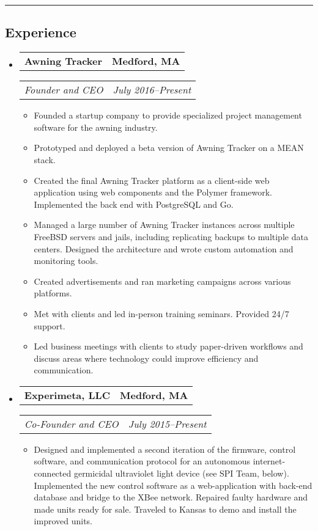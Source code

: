 \documentclass[10pt,letterpaper]{article}
\newcommand{\headerrow}[2]{%
    \begin{tabularx}{\linewidth}{Xr}
	    #1 & #2 \\
    \end{tabularx}
}
\begin{document}
\hrule
\vspace{-0.4em}
\subsection*{Experience}
\begin{itemize}
	\parskip=0.1em

	\item
	\headerrow{\textbf{Awning Tracker}}{\textbf{Medford, MA}}
	\headerrow{\emph{Founder and CEO}}{\emph{July 2016--Present}}
	\begin{itemize}
        \item Founded a startup company to provide specialized project
            management software for the awning industry.

        \item Prototyped and deployed a beta version of Awning Tracker on a
            MEAN stack.

        \item Created the final Awning Tracker platform as a client-side web
            application using web components and the Polymer framework.
            Implemented the back end with PostgreSQL and Go.

        \item Managed a large number of Awning Tracker instances across
            multiple FreeBSD servers and jails, including replicating backups
            to multiple data centers.  Designed the architecture and wrote
            custom automation and monitoring tools.

        \item Created advertisements and ran marketing campaigns across various
            platforms.

        \item Met with clients and led in-person training seminars.  Provided
            24/7 support.

        \item Led business meetings with clients to study paper-driven
            workflows and discuss areas where technology could improve
            efficiency and communication.
	\end{itemize}

    \item
    \headerrow{\textbf{Experimeta, LLC}}{\textbf{Medford, MA}}
    \headerrow{\emph{Co-Founder and CEO}}{\emph{July 2015--Present}}
    \begin{itemize}
        \item Designed and implemented a second iteration of the firmware,
            control software, and communication protocol for an autonomous
            internet-connected germicidal ultraviolet light device (see SPI
            Team, below).  Implemented the new control software as a
            web-application with back-end database and bridge to the XBee
            network.  Repaired faulty hardware and made units ready for sale.
            Traveled to Kansas to demo and install the improved units.
    \end{itemize}


\end{itemize}
\end{document}
